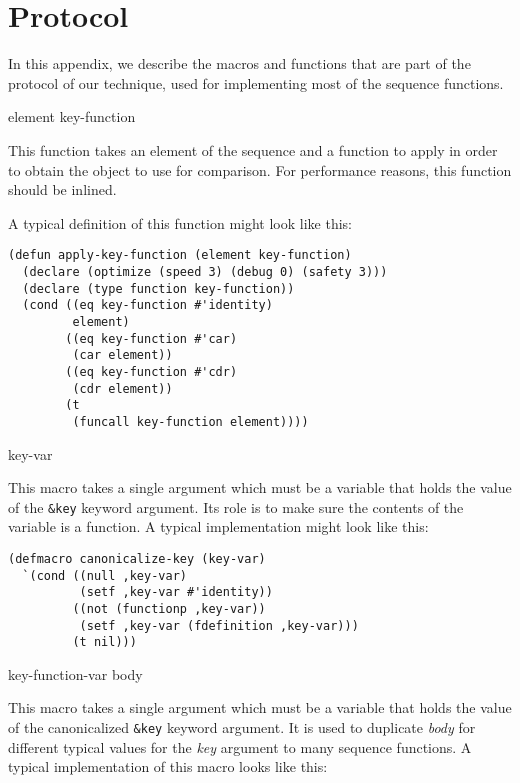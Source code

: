 \appendix

\section{Protocol}
\label{app-protocol}

In this appendix, we describe the macros and functions that are part
of the protocol of our technique, used for implementing most of the
sequence functions.

 {element key-function}

This function takes an element of the sequence and a function to apply
in order to obtain the object to use for comparison.  For performance
reasons, this function should be inlined.

A typical definition of this function might look like this:

{\small\begin{verbatim}
(defun apply-key-function (element key-function)
  (declare (optimize (speed 3) (debug 0) (safety 3)))
  (declare (type function key-function))
  (cond ((eq key-function #'identity)
         element)
        ((eq key-function #'car)
         (car element))
        ((eq key-function #'cdr)
         (cdr element))
        (t
         (funcall key-function element))))
\end{verbatim}}

 {key-var}

This macro takes a single argument which must be a variable that holds
the value of the \texttt{\&key} keyword argument.  Its role is to make
sure the contents of the variable is a function.  A typical
implementation might look like this:

{\small\begin{verbatim}
(defmacro canonicalize-key (key-var)
  `(cond ((null ,key-var)
          (setf ,key-var #'identity))
         ((not (functionp ,key-var))
          (setf ,key-var (fdefinition ,key-var)))
         (t nil)))
\end{verbatim}}

 {key-function-var \body body}

This macro takes a single argument which must be a variable that holds
the value of the canonicalized \texttt{\&key} keyword argument.  It is
used to duplicate \textit{body} for different typical values for the
\textit{key} argument to many sequence functions.  A typical
implementation of this macro looks like this:


